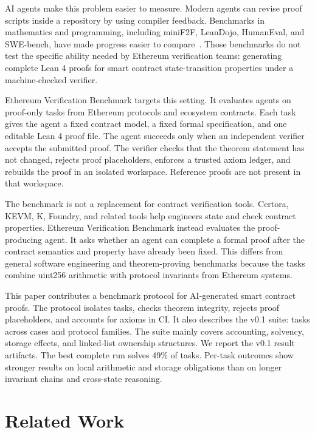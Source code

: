 \documentclass[conference]{IEEEtran}
\newcommand{\toolname}{Ethereum Verification Benchmark}
\newcommand{\lean}{Lean 4}
\begin{document}
AI agents make this problem easier to measure. Modern agents can revise proof
scripts inside a repository by using compiler feedback. Benchmarks in
mathematics and programming, including miniF2F, LeanDojo, HumanEval, and
SWE-bench, have made progress easier to compare~\cite{minif2f,leandojo,humaneval,swebench}.
Those benchmarks do not test the specific ability needed by Ethereum
verification teams: generating complete \lean{} proofs for smart contract
state-transition properties under a machine-checked verifier.

\toolname{} targets this setting. It evaluates agents on proof-only tasks from
Ethereum protocols and ecosystem contracts. Each task gives the agent a fixed
contract model, a fixed formal specification, and one editable \lean{} proof
file. The agent succeeds only when an independent verifier accepts the submitted
proof. The verifier checks that the theorem statement has not changed, rejects
proof placeholders, enforces a trusted axiom ledger, and rebuilds the proof in
an isolated workspace. Reference proofs are not present in that workspace.

The benchmark is not a replacement for contract verification tools. Certora,
KEVM, K, Foundry, and related tools help engineers state and check contract
properties. \toolname{} instead evaluates the proof-producing agent. It asks
whether an agent can complete a formal proof after the contract semantics and
property have already been fixed. This differs from general software engineering
and theorem-proving benchmarks because the tasks combine uint256 arithmetic with
protocol invariants from Ethereum systems.

This paper contributes a benchmark protocol for AI-generated smart contract
proofs. The protocol isolates tasks, checks theorem integrity, rejects proof
placeholders, and accounts for axioms in CI. It also describes the v0.1 suite:
\BenchmarkTaskCount{} tasks across \BenchmarkCaseCount{} cases and
\BenchmarkFamilyCount{} protocol families. The suite mainly covers accounting,
solvency, storage effects, and linked-list ownership structures. We report the
v0.1 result artifacts. The best complete run solves 49\% of tasks. Per-task
outcomes show stronger results on local arithmetic and storage obligations than
on longer invariant chains and cross-state reasoning.

\section{Related Work}
\end{document}
